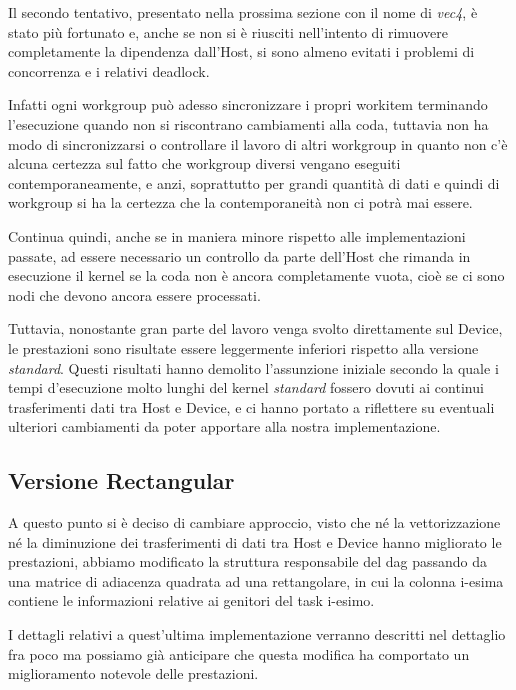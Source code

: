 \documentclass[../relazione.tex]{subfiles}
\begin{document}
Il secondo tentativo, presentato nella prossima sezione con il nome di \textit{vec4}, è stato più fortunato e, anche se non si è riusciti nell'intento di rimuovere completamente la dipendenza dall'Host, si sono almeno evitati i problemi di concorrenza e i relativi deadlock. 

Infatti ogni workgroup può adesso sincronizzare i propri workitem terminando l'esecuzione quando non si riscontrano cambiamenti alla coda, tuttavia non ha modo di sincronizzarsi o controllare il lavoro di altri workgroup in quanto non c'è alcuna certezza sul fatto che workgroup diversi vengano eseguiti contemporaneamente, e anzi, soprattutto per grandi quantità di dati e quindi di  workgroup si ha la certezza che la contemporaneità non ci potrà mai essere.

Continua quindi, anche se in maniera minore rispetto alle implementazioni passate, ad essere necessario un controllo da parte dell'Host che rimanda in esecuzione il kernel se la coda non è ancora completamente vuota, cioè se ci sono nodi che devono ancora essere processati.

Tuttavia, nonostante gran parte del lavoro venga svolto direttamente sul Device, le prestazioni sono risultate essere leggermente inferiori rispetto alla versione \textit{standard}. Questi risultati hanno demolito l'assunzione iniziale secondo la quale i tempi d'esecuzione molto lunghi del kernel \textit{standard} fossero dovuti ai continui trasferimenti dati tra Host e Device, e ci hanno portato a riflettere su eventuali ulteriori cambiamenti da poter apportare alla nostra implementazione.

\subsection{Versione Rectangular}
A questo punto si è deciso di cambiare approccio, visto che né la vettorizzazione né la diminuzione dei trasferimenti di dati tra Host e Device hanno migliorato le prestazioni, abbiamo modificato la struttura responsabile del \gls{dag} passando da una matrice di adiacenza quadrata ad una rettangolare, in cui la colonna i-esima contiene le informazioni relative ai genitori del task i-esimo.

I dettagli relativi a quest'ultima implementazione verranno descritti nel dettaglio fra poco ma possiamo già anticipare che questa modifica ha comportato un miglioramento notevole delle prestazioni.
\end{document}
